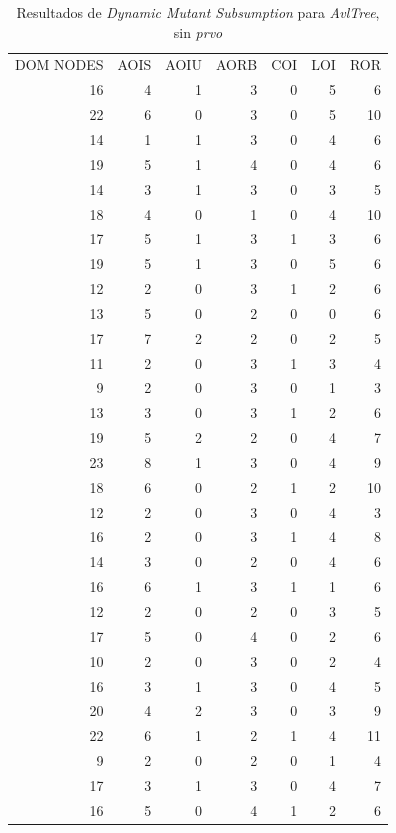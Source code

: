 \begin{table}[]
	\caption{Resultados de \emph{Dynamic Mutant Subsumption} para \emph{AvlTree}, sin \emph{prvo}}
	\label{tables.results.subsumption.avltree.noprvo}
	\centering
	\scriptsize
	\def\arraystretch{0.95}
	\setlength\tabcolsep{0.5mm}
	\begin{tabular}{rrrrrrr}
		DOM NODES & AOIS & AOIU & AORB & COI & LOI & ROR \\
		16 & 4 & 1 & 3 & 0 & 5 & 6 \\
		22 & 6 & 0 & 3 & 0 & 5 & 10 \\
		14 & 1 & 1 & 3 & 0 & 4 & 6 \\
		19 & 5 & 1 & 4 & 0 & 4 & 6 \\
		14 & 3 & 1 & 3 & 0 & 3 & 5 \\
		18 & 4 & 0 & 1 & 0 & 4 & 10 \\
		17 & 5 & 1 & 3 & 1 & 3 & 6 \\
		19 & 5 & 1 & 3 & 0 & 5 & 6 \\
		12 & 2 & 0 & 3 & 1 & 2 & 6 \\
		13 & 5 & 0 & 2 & 0 & 0 & 6 \\
		17 & 7 & 2 & 2 & 0 & 2 & 5 \\
		11 & 2 & 0 & 3 & 1 & 3 & 4 \\
		9 & 2 & 0 & 3 & 0 & 1 & 3 \\
		13 & 3 & 0 & 3 & 1 & 2 & 6 \\
		19 & 5 & 2 & 2 & 0 & 4 & 7 \\
		23 & 8 & 1 & 3 & 0 & 4 & 9 \\
		18 & 6 & 0 & 2 & 1 & 2 & 10 \\
		12 & 2 & 0 & 3 & 0 & 4 & 3 \\
		16 & 2 & 0 & 3 & 1 & 4 & 8 \\
		14 & 3 & 0 & 2 & 0 & 4 & 6 \\
		16 & 6 & 1 & 3 & 1 & 1 & 6 \\
		12 & 2 & 0 & 2 & 0 & 3 & 5 \\
		17 & 5 & 0 & 4 & 0 & 2 & 6 \\
		10 & 2 & 0 & 3 & 0 & 2 & 4 \\
		16 & 3 & 1 & 3 & 0 & 4 & 5 \\
		20 & 4 & 2 & 3 & 0 & 3 & 9 \\
		22 & 6 & 1 & 2 & 1 & 4 & 11 \\
		9 & 2 & 0 & 2 & 0 & 1 & 4 \\
		17 & 3 & 1 & 3 & 0 & 4 & 7 \\
		16 & 5 & 0 & 4 & 1 & 2 & 6
	\end{tabular}
\end{table}

